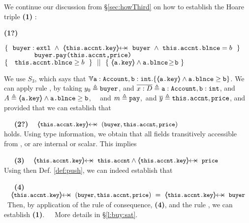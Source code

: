 \begin{example}
We continue our discussion from \S \ref{sec:howThird} on how to establish the Hoare triple    \textbf{(1)} :

 \vspace{.05cm}
  \begin{minipage}{.05\textwidth}
   \textbf{(1?)}\ \ 
\end{minipage}
\hfill
\begin{minipage}{.95\textwidth}
\begin{flushleft}
$\{\  \   \external{\prg{buyer}} \ \wedge\ 
   {\protectedFrom {\prg{this.\myAccount.key}}  {\prg{buyer} } }
 \ \wedge\ \prg{this.\myAccount.\balance}= b  \ \  \}$\\
$\ \ \ \ \ \ \ \ \ \ \ \ {\ \mbox{\normalfont{\texttt{buyer.pay(this.accnt,price)}}}   \ } $\\
$  \{\  \ \  {\mbox{\normalfont{\texttt{this.\mbox{\normalfont{\texttt{accnt}}}.\mbox{\normalfont{\texttt{blnce}}}}}}} \geq  b \  \  \} \ \ ||\ \  \{\ \langle\!\!\langle \mbox{\normalfont{\texttt{a.key}}} \rangle\!\!\rangle\wedge  \mbox{\normalfont{\texttt{a.\mbox{\normalfont{\texttt{blnce}}}}}}\!\geq\!{\mbox{\normalfont{\texttt{b}}}}   \ \}  $ 
\end{flushleft}
\end{minipage}
 
\vspace{.03cm}
\noindent
We use $S_3$, which says that $\TwoStatesN{ \prg{a}:\prg{Account},\prg{b}:\prg{int} } {\inside{\prg{a.key}} \wedge \prg{a.\balance} \geq \prg{b} }$. 
We can apply rule {}, by taking  $y_0 \triangleq \mbox{\normalfont{\texttt{buyer}}}$,  and $\overline {x : D}\triangleq \mbox{\normalfont{\texttt{a}}}:\mbox{\normalfont{\texttt{Account}}},\mbox{\normalfont{\texttt{b}}}:\mbox{\normalfont{\texttt{int}}}$, 
and $A \triangleq  \langle\!\!\langle \mbox{\normalfont{\texttt{a.key}}} \rangle\!\!\rangle\wedge \mbox{\normalfont{\texttt{a.\mbox{\normalfont{\texttt{blnce}}}}}}\geq \mbox{\normalfont{\texttt{b}}}$, \ \ 
and $m \triangleq \mbox{\normalfont{\texttt{pay}}}$,\ and $\overline {y} \triangleq \mbox{\normalfont{\texttt{this.accnt}}},\mbox{\normalfont{\texttt{price}}}$,
and provided that we can establish that\\
\strut \ \ \   \textbf{(2?)}  $ {\small{\strut \ \ \ \protectedFrom {} {(\prg{buyer},\prg{this.\myAccount},)}}}$\\
holds. Using type information, we obtain that all fields transitively accessible from \prg{this.\myAccount.key}, or \prg{price} are internal or scalar. This implies\\
\strut \ \ \   \textbf{(3)}  $ {\small{\strut \ \ \ \protectedFrom {\prg{this.\myAccount.key}} {\prg{this.\myAccount}} \wedge  \protectedFrom {\prg{this.\myAccount.key}} {\prg{price}}}} $\\
Using then    Def. \ref{def:push},  we can indeed establish that\\
\strut \ \ \   \textbf{(4)} $ {\small{\strut \ \ \ \protectedFrom {\prg{this.\myAccount.key}} {(\prg{buyer},\prg{this.\myAccount},\prg{price})}  \ = \   \protectedFrom {\prg{this.\myAccount.key}} {\prg{buyer}}}}$\
Then, by application of the rule of consequence, \textbf{(4)}, and the rule {}, we can establish \textbf{(1)}.\ \ \ 
More details in \S  \ref{l:buy:sat}.
\end{example}

